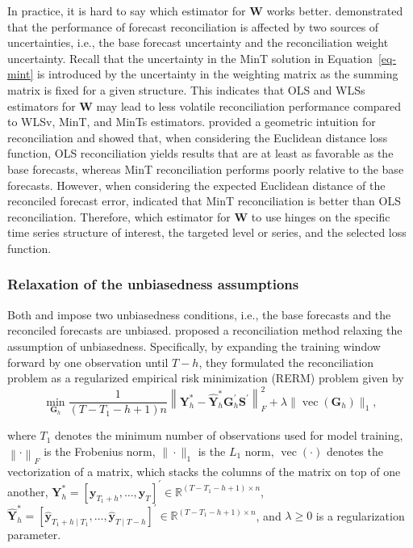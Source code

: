 \documentclass[11pt,a4paper,]{article}
\begin{document}
In practice, it is hard to say which estimator for \(\boldsymbol{W}\)
works better. \textcite{Pritularga2021-lz} demonstrated that the
performance of forecast reconciliation is affected by two sources of
uncertainties, i.e., the base forecast uncertainty and the
reconciliation weight uncertainty. Recall that the uncertainty in the
MinT solution in Equation~\ref{eq-mint} is introduced by the uncertainty
in the weighting matrix as the summing matrix is fixed for a given
structure. This indicates that OLS and WLSs estimators for
\(\boldsymbol{W}\) may lead to less volatile reconciliation performance
compared to WLSv, MinT, and MinTs estimators.
\textcite{Panagiotelis2021-mf} provided a geometric intuition for
reconciliation and showed that, when considering the Euclidean distance
loss function, OLS reconciliation yields results that are at least as
favorable as the base forecasts, whereas MinT reconciliation performs
poorly relative to the base forecasts. However, when considering the
expected Euclidean distance of the reconciled forecast error,
\textcite{Wickramasuriya2021-am} indicated that MinT reconciliation is
better than OLS reconciliation. Therefore, which estimator for
\(\boldsymbol{W}\) to use hinges on the specific time series structure
of interest, the targeted level or series, and the selected loss
function.

\hypertarget{relaxation-of-the-unbiasedness-assumptions}{%
\subsubsection{Relaxation of the unbiasedness
assumptions}\label{relaxation-of-the-unbiasedness-assumptions}}

Both \textcite{Hyndman2011-sd} and \textcite{Wickramasuriya2019-fc}
impose two unbiasedness conditions, i.e., the base forecasts and the
reconciled forecasts are unbiased. \textcite{Ben_Taieb2019-be} proposed
a reconciliation method relaxing the assumption of unbiasedness.
Specifically, by expanding the training window forward by one
observation until \(T-h\), they formulated the reconciliation problem as
a regularized empirical risk minimization (RERM) problem given by \[
\min _{\boldsymbol{G}_h} \frac{1}{(T-T_1-h+1)n}\left\|\boldsymbol{Y}_{h}^{*}-\hat{\boldsymbol{Y}}_{h}^{*} \mathbf{G}_{h}^{\prime} \boldsymbol{S}^{\prime}\right\|_F^2+\lambda\|\operatorname{vec}( \boldsymbol{G}_h)\|_1,
\]

where \(T_1\) denotes the minimum number of observations used for model
training, \(\left\| \cdot \right\|_F\) is the Frobenius norm,
\(\|\cdot\|_1\) is the \(L_1\) norm, \(\operatorname{vec}(\cdot)\)
denotes the vectorization of a matrix, which stacks the columns of the
matrix on top of one another,
\(\boldsymbol{Y}_{h}^{*}=\left[\boldsymbol{y}_{T_1+h}, \ldots, \boldsymbol{y}_T\right]^{\prime} \in \mathbb{R}^{\left(T-T_1-h+1\right) \times n}\),
\(\hat{\boldsymbol{Y}}_{h}^{*}=\left[\hat{\boldsymbol{y}}_{T_1+h \mid T_1}, \ldots, \hat{\boldsymbol{y}}_{T \mid T-h}\right]^{\prime} \in \mathbb{R}^{\left(T-T_1-h+1\right) \times n}\),
and \(\lambda \geq 0\) is a regularization parameter.
\end{document}
